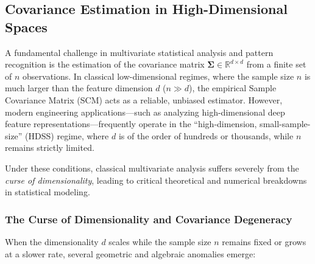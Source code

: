 \subsection{Covariance Estimation in High-Dimensional Spaces}

A fundamental challenge in multivariate statistical analysis and pattern recognition is the estimation of the covariance matrix $\boldsymbol{\Sigma} \in \mathbb{R}^{d \times d}$ from a finite set of $n$ observations. In classical low-dimensional regimes, where the sample size $n$ is much larger than the feature dimension $d$ ($n \gg d$), the empirical Sample Covariance Matrix (SCM) acts as a reliable, unbiased estimator. However, modern engineering applications—such as analyzing high-dimensional deep feature representations—frequently operate in the ``high-dimension, small-sample-size'' (HDSS) regime, where $d$ is of the order of hundreds or thousands, while $n$ remains strictly limited.

Under these conditions, classical multivariate analysis suffers severely from the \textit{curse of dimensionality}, leading to critical theoretical and numerical breakdowns in statistical modeling.

\subsubsection{The Curse of Dimensionality and Covariance Degeneracy}

When the dimensionality $d$ scales while the sample size $n$ remains fixed or grows at a slower rate, several geometric and algebraic anomalies emerge:

